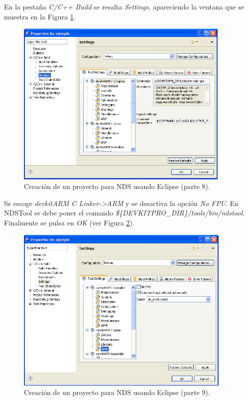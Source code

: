 En la pestaña \textit{C/C++ Build} se resalta \textit{Settings}, apareciendo la ventana que se muestra en la Figura \ref{fig_c2_eclipse7}.

\begin{figure}[t]
	\centering
	\includegraphics[height=8cm]{./Figuras/C2/c2_eclipse7.png}
	\caption{Creación de un proyecto para NDS usando Eclipse  (parte 8).}
	\label{fig_c2_eclipse7}
\end{figure}

Se escoge \textit{devkitARM C Linker->ARM} y se desactiva la opción \textit{No FPU}. En NDSTool se debe poner el comando \textit{\$\{DEVKITPRO\_DIR\}/tools/bin/ndstool}. Finalmente se pulsa en \textit{OK} (ver Figura \ref{fig_c2_eclipse8}).

\begin{figure}[t]
	\centering
	\includegraphics[height=8cm]{./Figuras/C2/c2_eclipse8.png}
	\caption{Creación de un proyecto para NDS usando Eclipse  (parte 9).}
	\label{fig_c2_eclipse8}
\end{figure}

